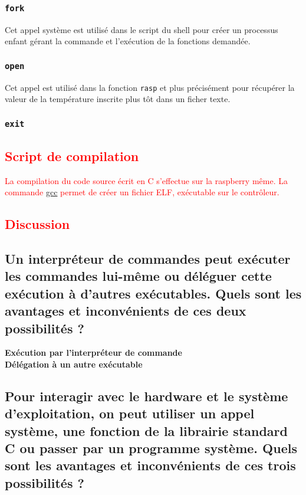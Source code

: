 \documentclass[10pt,a4paper]{article}
\begin{document}
\subsubsection{\texttt{fork}}
Cet appel système est utilisé dans le script du shell pour créer un processus enfant gérant la commande et l'exécution de la fonctions demandée. 

\subsubsection{\texttt{open}}
Cet appel est utilisé dans la fonction \texttt{rasp} et plus précisément pour récupérer la valeur de la température inscrite plus tôt dans un ficher texte. 

\subsubsection{\texttt{exit}}


\textcolor{red}{
\subsection{Script de compilation}
La compilation du code source écrit en C s'effectue sur la raspberry même. La commande \url{gcc} permet de créer un fichier ELF, exécutable sur le contrôleur. 
}

\textcolor{red}{\section{Discussion}}
\subsection*{Un interpréteur de commandes peut exécuter les commandes lui-même ou déléguer cette exécution à d'autres exécutables. Quels sont les avantages et inconvénients de ces deux possibilités ?}

\textbf{Exécution par l'interpréteur de commande\\}
\textbf{Délégation à un autre exécutable\\}


\subsection*{Pour interagir avec le hardware et le système d'exploitation, on peut utiliser un appel système, une  fonction  de  la  librairie  standard  C  ou  passer  par  un  programme  système.  Quels  sont  les avantages et inconvénients de ces trois possibilités ?}
\end{document}

